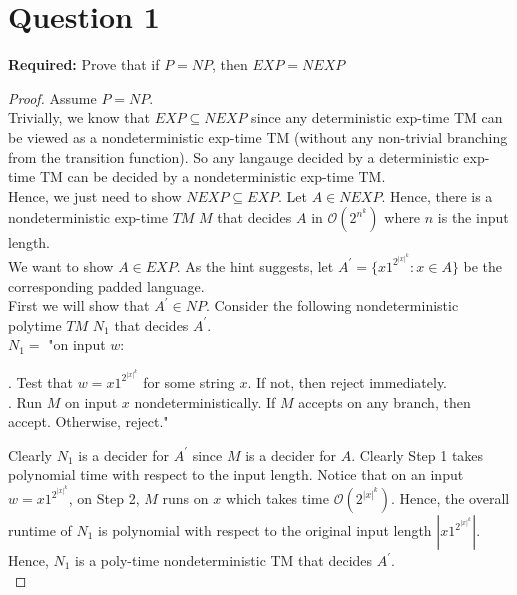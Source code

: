 \documentclass[12pt]{article}
\begin{document}

\setlength\parindent{0pt}

\section*{Question 1}

\textbf{Required:} Prove that if $P = NP$, then $EXP = NEXP$ 

\begin{proof}
Assume $P = NP$. \\

Trivially, we know that $EXP \subseteq NEXP$ since any deterministic exp-time TM can be viewed as a nondeterministic exp-time TM (without any non-trivial branching from the transition function). So any langauge decided by a deterministic exp-time TM can be decided by a nondeterministic exp-time TM. \\

Hence, we just need to show $NEXP \subseteq EXP$. Let $A \in NEXP$. Hence, there is a nondeterministic exp-time $TM$ $M$ that decides $A$ in $\mathcal{O}(2^{n^k})$ where $n$ is the input length. \\

We want to show $A \in EXP$. As the hint suggests, let $A^\prime = \{x1^{2^{|x|^k}} : x \in A\}$ be the corresponding padded language. \\

First we will show that $A^\prime \in NP$. Consider the following nondeterministic polytime $TM$ $N_1$ that decides $A^\prime$. \\

$N_1 = $ "on input $w$: \\

\setlength\parindent{15pt}

. Test that $w =x1^{2^{|x|^k}}$ for some string $x$. If not, then reject immediately. \\

. Run $M$ on input $x$ nondeterministically. If $M$ accepts on any branch, then accept. Otherwise, reject." \\

\setlength\parindent{0pt}

Clearly $N_1$ is a decider for $A^\prime$ since $M$ is a decider for $A$. Clearly Step 1 takes polynomial time with respect to the input length. Notice that on an input $w = x1^{2^{|x|^k}}$, on Step 2, $M$ runs on $x$ which takes time $\mathcal{O}(2^{|x|^k})$. Hence, the overall runtime of $N_1$ is polynomial with respect to the original input length $|x1^{2^{|x|^k}}|$. Hence, $N_1$ is a poly-time nondeterministic TM that decides $A^\prime$. \\


\end{proof}
\end{document}

